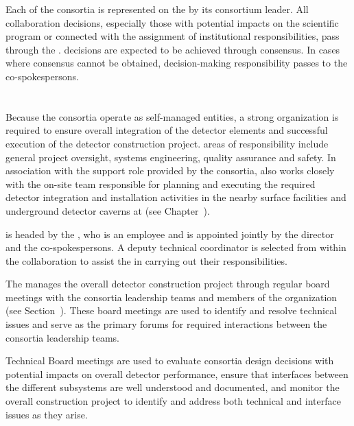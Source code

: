 Each of the consortia is represented on the   by its 
consortium leader.  All collaboration decisions, especially those with potential 
impacts on the  scientific program or connected with the assignment 
of institutional responsibilities, pass through the .   
decisions are expected to be achieved through consensus.  In cases where consensus 
cannot be obtained, decision-making responsibility passes to the co-spokespersons.

\section{}
\label{sec:tc}

Because the consortia operate as self-managed entities, a strong
 organization is required to ensure overall integration 
of the detector elements and successful execution of the detector
construction project.   areas of responsibility include 
general project oversight, systems engineering, quality assurance 
and safety.  In association with the support role provided by 
the consortia,  also works closely with the on-site 
team responsible for planning and executing the required 
detector integration and installation activities in the nearby 
surface facilities and underground detector caverns at \surf 
(see Chapter~\label{ch:tc-jpo}).  

 is headed by the , who is an 
employee and is appointed jointly by the  director and 
the  co-spokespersons.  A deputy technical coordinator 
is selected from within the collaboration to assist the  
in carrying out their responsibilities.

The  manages the overall detector construction project
through regular board meetings with the consortia leadership teams and 
members of the  organization (see Section~\label{sec:tco}).  
These board meetings are used to identify and resolve technical issues
and serve as the primary forums for required interactions between the 
consortia leadership teams.

Technical Board meetings are used to evaluate consortia design
decisions with potential impacts on overall detector performance,
ensure that interfaces between the different subsystems are well
understood and documented, and monitor the overall construction
project to identify and address both technical and interface issues 
as they arise.

